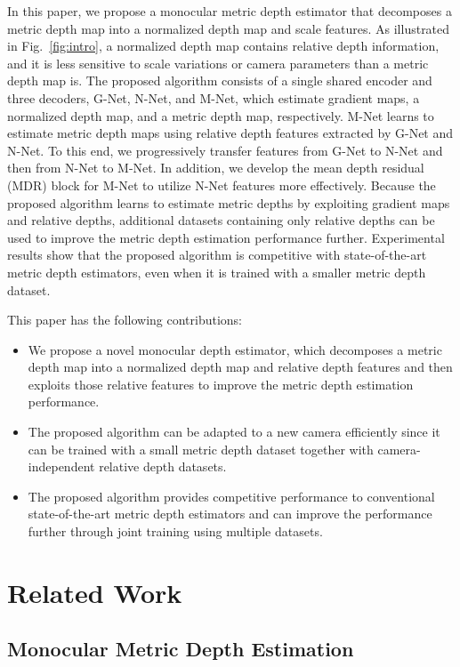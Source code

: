 \documentclass[runningheads]{llncs}
\begin{document}
In this paper, we propose a monocular metric depth estimator that decomposes a metric depth map into a normalized depth map and scale features. As illustrated in Fig.~\ref{fig:intro}, a normalized depth map contains relative depth information, and it is less sensitive to scale variations or camera parameters than a metric depth map is. The proposed algorithm consists of a single shared encoder and three decoders, G-Net, N-Net, and M-Net, which estimate gradient maps, a normalized depth map, and a metric depth map, respectively. M-Net learns to estimate metric depth maps using relative depth features extracted by G-Net and N-Net. To this end, we progressively transfer features from G-Net to N-Net and then from N-Net to M-Net. In addition, we develop the mean depth residual (MDR) block for M-Net to utilize N-Net features more effectively. Because the proposed algorithm learns to estimate metric depths by exploiting gradient maps and relative depths, additional datasets containing only relative depths can be used to improve the metric depth estimation performance further. Experimental results show that the proposed algorithm is competitive with state-of-the-art metric depth estimators, even when it is trained with a smaller metric depth dataset.

This paper has the following contributions:
\begin{itemize}
    \itemsep0em
    \item We propose a novel monocular depth estimator, which decomposes a metric depth map into a normalized depth map and relative depth features and then exploits those relative features to improve the metric depth estimation performance.

    \item The proposed algorithm can be adapted to a new camera efficiently since it can be trained with a small metric depth dataset together with camera-independent relative depth datasets.

    \item The proposed algorithm provides competitive performance to conventional state-of-the-art metric depth estimators and can improve the performance further through joint training using multiple datasets.
\end{itemize}
\section{Related Work}
\label{sec:related_work}

\subsection{Monocular Metric Depth Estimation}
\end{document}
